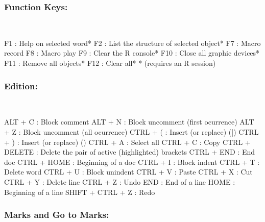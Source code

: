 \newpage
\subsubsection{Function Keys:}\\

\vspace{-0.5cm}
\begin{Rtables}[caption={[Function keys]
    Function keys},
  label=hotkey:function]
  F1  : Help on selected word*
  F2  : List the structure of selected object*
  F7  : Macro record
  F8  : Macro play
  F9  : Clear the R console*
  F10 : Close all graphic devices*
  F11 : Remove all objects*
  F12 : Clear all*
  * (requires an R session)
\end{Rtables}


\subsubsection{Edition:}\\

\vspace{-0.5cm}
\begin{Rtables}[caption={[Edition keyboard shortcuts]
    Edition keyboard shortcuts},
  label=hotkey:editions]
  ALT   + C        : Block comment
  ALT   + N        : Block uncomment (first ocurrence)
  ALT   + Z        : Block uncomment (all ocurrence)
  CTRL  + (        : Insert (or replace) (|)
  CTRL  + )        : Insert (or replace) ()
  CTRL  + A        : Select all
  CTRL  + C        : Copy
  CTRL  + DELETE   : Delete the pair of active (highlighted) brackets
  CTRL  + END      : End doc
  CTRL  + HOME     : Beginning of a doc
  CTRL  + I        : Block indent
  CTRL  + T        : Delete word
  CTRL  + U        : Block unindent
  CTRL  + V        : Paste
  CTRL  + X        : Cut
  CTRL  + Y        : Delete line
  CTRL  + Z        : Undo
  END              : End of a line
  HOME             : Beginning of a line
  SHIFT + CTRL + Z : Redo
\end{Rtables}


\subsubsection{Marks and Go to Marks:}\\

